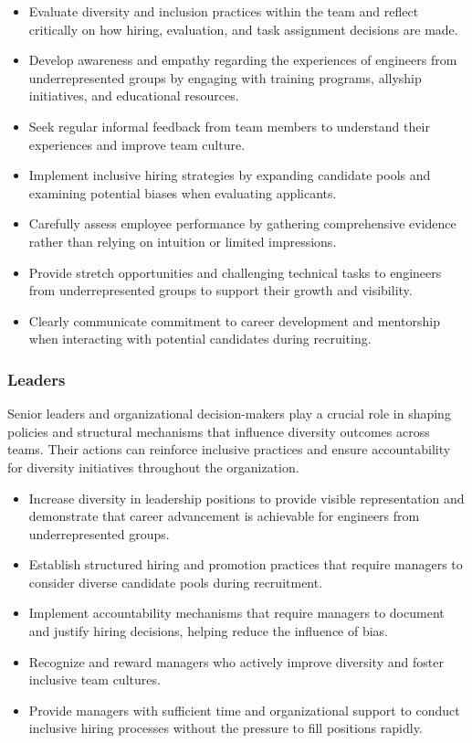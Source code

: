 \begin{itemize}
    \item Evaluate diversity and inclusion practices within the team and reflect critically on how hiring, evaluation, and task assignment decisions are made.
    \item Develop awareness and empathy regarding the experiences of engineers from underrepresented groups by engaging with training programs, allyship initiatives, and educational resources.
    \item Seek regular informal feedback from team members to understand their experiences and improve team culture.
    \item Implement inclusive hiring strategies by expanding candidate pools and examining potential biases when evaluating applicants.
    \item Carefully assess employee performance by gathering comprehensive evidence rather than relying on intuition or limited impressions.
    \item Provide stretch opportunities and challenging technical tasks to engineers from underrepresented groups to support their growth and visibility.
    \item Clearly communicate commitment to career development and mentorship when interacting with potential candidates during recruiting.
\end{itemize}

\subsubsection{Leaders}

Senior leaders and organizational decision-makers play a crucial role in shaping policies and structural mechanisms that influence diversity outcomes across teams. Their actions can reinforce inclusive practices and ensure accountability for diversity initiatives throughout the organization.

\begin{itemize}
    \item Increase diversity in leadership positions to provide visible representation and demonstrate that career advancement is achievable for engineers from underrepresented groups.
    \item Establish structured hiring and promotion practices that require managers to consider diverse candidate pools during recruitment.
    \item Implement accountability mechanisms that require managers to document and justify hiring decisions, helping reduce the influence of bias.
    \item Recognize and reward managers who actively improve diversity and foster inclusive team cultures.
    \item Provide managers with sufficient time and organizational support to conduct inclusive hiring processes without the pressure to fill positions rapidly.
\end{itemize}

